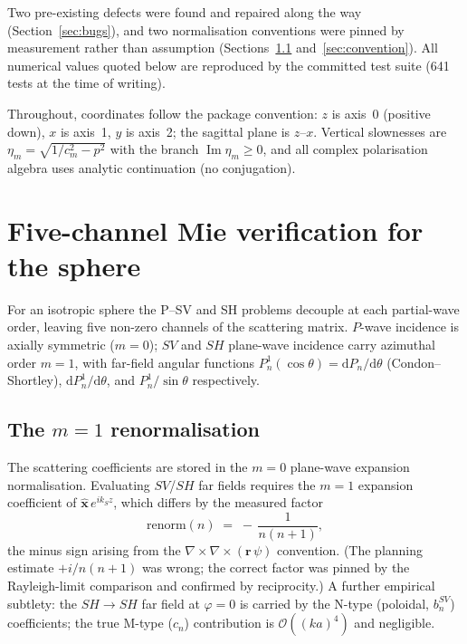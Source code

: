 \documentclass[11pt,a4paper]{article}
\newcommand{\dd}{\mathrm{d}}
\newcommand{\order}[1]{\mathcal{O}\!\left(#1\right)}
\newcommand{\im}{\operatorname{Im}}
\begin{document}
Two pre-existing defects were found and repaired along the way
(Section~\ref{sec:bugs}), and two normalisation conventions were pinned
by measurement rather than assumption
(Sections~\ref{sec:sphere-renorm} and~\ref{sec:convention}).  All
numerical values quoted below are reproduced by the committed test
suite (641 tests at the time of writing).

Throughout, coordinates follow the package convention: $z$ is axis~0
(positive down), $x$ is axis~1, $y$ is axis~2; the sagittal plane is
$z$--$x$.  Vertical slownesses are
$\eta_m = \sqrt{1/c_m^2 - p^2}$ with the branch $\im\eta_m \ge 0$, and
all complex polarisation algebra uses analytic continuation (no
conjugation).

\section{Five-channel Mie verification for the sphere}
\label{sec:sphere}

For an isotropic sphere the P--SV and SH problems decouple at each
partial-wave order, leaving five non-zero channels of the scattering
matrix.  $P$-wave incidence is axially symmetric ($m=0$); $SV$ and $SH$
plane-wave incidence carry azimuthal order $m=1$, with far-field angular
functions $P_n^1(\cos\theta) = \dd P_n/\dd\theta$ (Condon--Shortley),
$\dd P_n^1/\dd\theta$, and $P_n^1/\sin\theta$ respectively.

\subsection{The $m{=}1$ renormalisation}
\label{sec:sphere-renorm}

The scattering coefficients are stored in the $m{=}0$ plane-wave
expansion normalisation.  Evaluating $SV$/$SH$ far fields requires the
$m{=}1$ expansion coefficient of $\hat{\mathbf{x}}\,e^{ik_S z}$, which
differs by the measured factor
\begin{equation}
  \mathrm{renorm}(n) \;=\; -\,\frac{1}{n(n+1)},
  \label{eq:renorm}
\end{equation}
the minus sign arising from the
$\nabla\times\nabla\times(\mathbf{r}\,\psi)$ convention.  (The planning
estimate $+i/n(n+1)$ was wrong; the correct factor was pinned by the
Rayleigh-limit comparison and confirmed by reciprocity.)  A further
empirical subtlety: the $SH{\to}SH$ far field at $\varphi = 0$ is
carried by the N-type (poloidal, $b_n^{SV}$) coefficients; the true
M-type ($c_n$) contribution is $\order{(ka)^4}$ and negligible.
\end{document}
